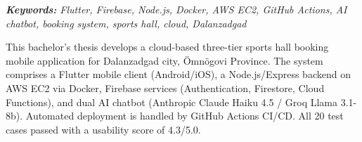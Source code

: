 \bigskip

\textit{\textbf{Keywords:} Flutter, Firebase, Node.js, Docker, AWS EC2, GitHub Actions, AI chatbot, booking system, sports hall, cloud, Dalanzadgad}

\bigskip

This bachelor's thesis develops a cloud-based three-tier sports hall booking mobile application for Dalanzadgad city, Ömnögovi Province. The system comprises a Flutter mobile client (Android/iOS), a Node.js/Express backend on AWS EC2 via Docker, Firebase services (Authentication, Firestore, Cloud Functions), and dual AI chatbot (Anthropic Claude Haiku 4.5 / Groq Llama 3.1-8b). Automated deployment is handled by GitHub Actions CI/CD. All 20 test cases passed with a usability score of 4.3/5.0.
